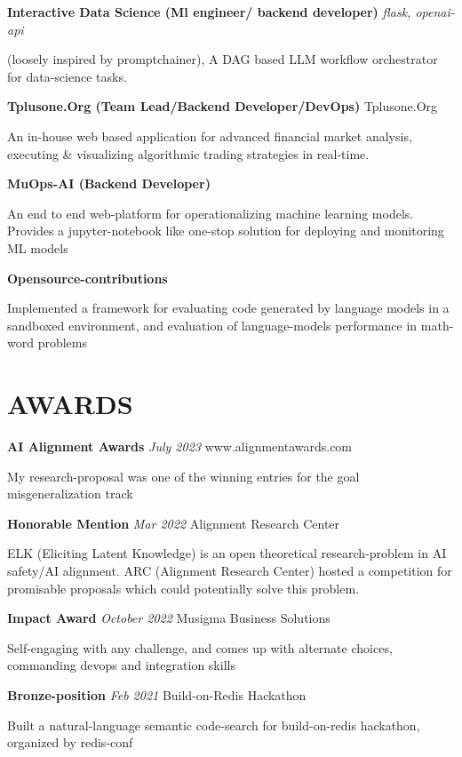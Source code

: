 \documentclass[fontsize=11pt]{article}
\newcommand{\sepspace}{\vspace*{1em}}   %
\newcommand{\NewPart}[1]{\section*{\uppercase{#1}}}
\newcommand{\EducationEntry}[4]{
    \noindent \textbf{#1} \hfill      %
    \colorbox{Black}{
      \parbox{8.5em}{
      \hfill\color{White}#2}} \par  %
    \noindent \textit{#3} \par        %
    \noindent\hangindent=2em\hangafter=0 \small #4 %
    \normalsize \par}
\newcommand{\ProjectEntry}[4]{         %
    \noindent \textbf{#1} \noindent \textit{#3} \hfill {#2} \par
    \noindent \small #4 %
    \normalsize \par}
\newcommand{\AwardEntry}[4]{         %
    \noindent \textbf{#1} \noindent \textit{#3} \hfill {#2} \par
    \noindent \small #4 %
    \normalsize \par}
\begin{document}
\ProjectEntry{Interactive Data Science (Ml engineer/ backend developer)}{}
{flask, openai-api}
{(loosely inspired by promptchainer), A DAG based LLM workflow orchestrator for data-science tasks.}
\sepspace
\ProjectEntry{Tplusone.Org (Team Lead/Backend Developer/DevOps)}{Tplusone.Org}
{}
{An in-house web based application for advanced financial market analysis, executing \& visualizing algorithmic trading strategies in real-time.}
\sepspace
\ProjectEntry{MuOps-AI (Backend Developer)}{}
{}
{An end to end web-platform for operationalizing machine learning models. Provides a jupyter-notebook like one-stop solution for deploying and monitoring ML models}
\sepspace
\ProjectEntry{Opensource-contributions}{}
{}
{Implemented a framework for evaluating code generated by language models in a sandboxed environment, and evaluation of language-model\textquotesingle{}s performance in math-word problems}
\NewPart{Awards}{}

\AwardEntry{AI Alignment Awards}{www.alignmentawards.com}
{July 2023}
{My research-proposal was one of the winning entries for the \textquotedbl{}goal misgeneralization\textquotedbl{} track}
\sepspace
\AwardEntry{Honorable Mention}{Alignment Research Center}
{Mar 2022}
{ELK (Eliciting Latent Knowledge) is an open theoretical research-problem in AI safety/AI alignment. ARC (Alignment Research Center) hosted a competition for promisable proposals which could potentially solve this problem.}
\sepspace
\AwardEntry{Impact Award}{Musigma Business Solutions}
{October 2022}
{Self-engaging with any challenge, and comes up with alternate choices, commanding devops and integration skills}
\sepspace
\AwardEntry{Bronze-position}{Build-on-Redis Hackathon}
{Feb 2021}
{Built a natural-language semantic code-search for build-on-redis hackathon, organized by redis-conf}
\ 
\end{document}
